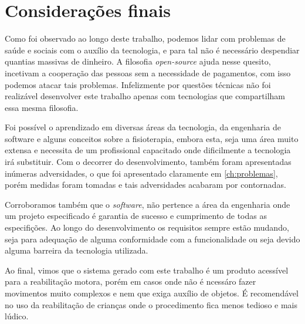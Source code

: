 \chapter[Considerações finais]{Considerações finais}\label{ch:conclusao}
  Como foi observado ao longo deste trabalho, podemos lidar com problemas de saúde e sociais com o auxílio da tecnologia,
e para tal não é necessário despendiar quantias massivas de dinheiro. A filosofia \textit{open-source} ajuda nesse quesito, incetivam a cooperação das pessoas
sem a necessidade de pagamentos, com isso podemos atacar tais problemas. Infelizmente por questões  técnicas não foi realizável desenvolver este trabalho apenas com
tecnologias que compartilham essa mesma filosofia.

  Foi possível o aprendizado em diversas áreas da tecnologia, da engenharia de software e alguns conceitos sobre a fisioterapia,
embora esta, seja uma área muito extensa e necessita de um profissional capacitado onde dificilmente a tecnologia irá substituir.
Com o decorrer do desenvolvimento, também foram apresentadas inúmeras adversidades, o que foi apresentado claramente em \ref{ch:problemas},
porém medidas foram tomadas e tais adversidades acabaram por contornadas.

  Corroboramos também que o \textit{software}, não pertence a área da engenharia onde um projeto especificado  é garantia de sucesso e cumprimento de todas as especifições. Ao longo do desenvolvimento
os requisitos sempre estão mudando, seja para adequação de alguma conformidade com a funcionalidade ou seja devido alguma barreira da tecnologia utilizada.

  Ao final, vimos que o sistema gerado com este trabalho é um produto acessível para a reabilitação motora, porém em casos onde não é ncessáro
fazer movimentos muito complexos e nem que exiga auxílio de objetos. É recomendável no uso da reabilitação de crianças onde o procedimento
fica menos tedioso e mais lúdico.
